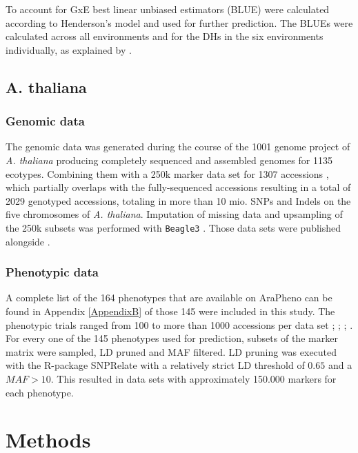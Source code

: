 To account for GxE best linear unbiased estimators (BLUE) were calculated according to
Henderson's model \cite{henderson1975best} and used for further prediction. The BLUEs were
calculated across all environments and for the DHs in the six environments individually,
as explained by \cite{holker2019european}.


\subsection{A. thaliana}

\subsubsection{Genomic data}

The genomic data was generated during the course of the 1001 genome project of
\textit{A. thaliana} \cite{1001genome} producing completely sequenced and assembled
genomes for 1135 ecotypes. Combining them with a 250k marker data set for 1307 accessions
\cite{horton2012genome}, which partially overlaps with the fully-sequenced accessions resulting
in a total of 2029 genotyped accessions, totaling in more than 10 mio. SNPs and Indels on
the five chromosomes of \textit{A. thaliana}. Imputation of missing data and upsampling of
the 250k subsets was performed with \texttt{Beagle3}
\cite{browning2007rapid}. Those data sets were published alongside \cite{tong2019}. \\


\subsubsection{Phenotypic data}
A complete list of the 164 phenotypes that are available on AraPheno can be found in
Appendix \ref{AppendixB} \cite{seren2016arapheno} of those 145 were included in this
study. The phenotypic trials ranged from 100 to more than 1000 accessions per data set
\cite{atwell2010}; \cite{li2010}; \cite{me2014};
\cite{strauch2015}.\\
For every one of the 145 phenotypes used for prediction, subsets of the marker matrix were
sampled, LD pruned and MAF filtered. LD pruning was executed with the R-package SNPRelate
\cite{zheng2013tutorial} with a relatively strict LD threshold of $0.65$ and a
$MAF > 10 $. This resulted in data sets with approximately 150.000 markers for each
phenotype.

\section{Methods}

